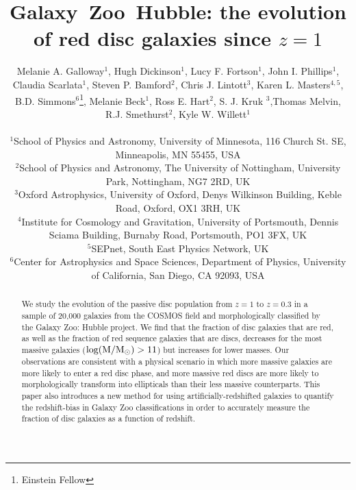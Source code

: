 \documentclass[useAMS,usenatbib]{mn2e}
\begin{document}
\title[Galaxy~Zoo~Hubble: passive red discs]{Galaxy~Zoo~Hubble: the evolution of red disc galaxies since $z=1$}
\author[Galloway et~al.]{\parbox[t]{16cm}{Melanie A. Galloway$^{1}$, 
Hugh Dickinson$^{1}$, Lucy F. Fortson$^{1}$, John I. Phillips$^{1}$, Claudia Scarlata$^{1}$,
Steven P. Bamford$^{2}$, Chris J. Lintott$^{3}$, Karen L. Masters$^{4,5}$, 
B.D. Simmons$^{6}$\footnote{Einstein Fellow}, 
Melanie Beck$^{1}$, Ross E. Hart$^{2}$, S. J. Kruk $^{3}$,Thomas Melvin, 
R.J. Smethurst$^{2}$, Kyle W. Willett$^{1}$
\vspace{0.1in} }\\
$^{1}$School of Physics and Astronomy, University of Minnesota, 116 Church St. SE, Minneapolis, MN 55455, USA \\
$^{2}$School of Physics and Astronomy, The University of Nottingham, University Park, Nottingham, NG7 2RD, UK \\
$^{3}$Oxford Astrophysics, University of Oxford, Denys Wilkinson Building, Keble Road, Oxford, OX1 3RH, UK \\
$^{4}$Institute for Cosmology and Gravitation, University of Portsmouth, Dennis Sciama Building, Burnaby Road, Portsmouth, PO1 3FX, UK \\
$^{5}$SEPnet, South East Physics Network, UK \\
$^{6}$Center for Astrophysics and Space Sciences, Department of Physics, University of California, San Diego, CA 92093, USA \\
   }
\maketitle

\begin{abstract}
We study the evolution of the passive disc population from $z=1$ to $z=0.3$ in a sample of 20,000 galaxies from the COSMOS field and morphologically classified by the Galaxy Zoo: Hubble project. We find that the fraction of disc galaxies that are red, as well as the fraction of red sequence galaxies that are discs, decreases for the most massive galaxies ($\rm log(M/M_{\odot})>11$) but increases for lower masses. Our observations are consistent with a physical scenario in which more massive galaxies are more likely to enter a red disc phase, and more massive red discs are more likely to morphologically transform into ellipticals than their less massive counterparts. This paper also introduces a new method for using artificially-redshifted galaxies to quantify the redshift-bias in Galaxy Zoo classifications in order to accurately measure the fraction of disc galaxies as a function of redshift.  


\end{abstract}
\end{document}
